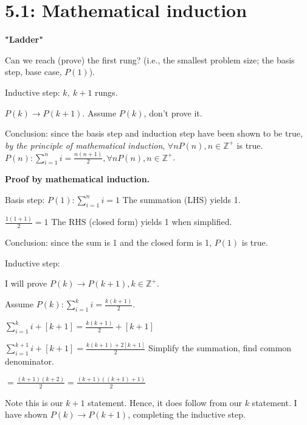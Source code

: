 \documentclass{exam}
\begin{document}
	
    \section{5.1: Mathematical induction}
    
    \textbf{"Ladder"}
    
    Can we reach (prove) the first rung? (i.e., the smallest problem size; the basis step, base case, $P(1)$).
    
    Inductive step: $k,\ k+1$ rungs.
    
    $P(k) \rightarrow P(k+1)$. Assume $P(k)$, don't prove it.
    
    Conclusion: since the basis step and induction step have been shown to be true, \textit{by the principle of mathematical induction}, $\forall n P(n), n \in \mathbb Z^+$ is true. \\
    
    $P(n): \sum_{i=1}^{n} i = \frac{n(n+1)}{2}, \forall n P(n), n \in \mathbb Z^+$.
    
    \textbf{Proof by mathematical induction.}
    
    Basis step: $P(1): \sum_{i=1}^{n} i = 1$ The summation (LHS) yields 1.
    
    $\frac{1(1+1)}{2} = 1$ The RHS (closed form) yields 1 when simplified.
    
    Conclusion: since the sum is 1 and the closed form is 1, $P(1)$ is true.
    
    Inductive step:
    
    I will prove $P(k) \rightarrow P(k+1), k \in \mathbb Z^+$.
    
    Assume $P(k): \sum_{i=1}^{k} i = \frac{k(k+1)}{2}$.
    
    \noindent{}
    
    $\sum_{i=1}^{k} i + [k+1] = \frac{k(k+1)}{2} + [k+1]$
    
    $\sum_{i=1}^{k+1} i + [k+1] = \frac{k(k+1)+2[k+1]}{2}$ Simplify the summation, find common denominator.
    
    \qquad \qquad$= \frac{(k+1)(k+2)}{2} = \frac{(k+1)((k+1)+1)}{2}$
    
    Note this is our $k+1$ statement. Hence, it does follow from our $k$ statement. I have shown $P(k) \rightarrow P(k+1)$, completing the inductive step.
    
\end{document}
